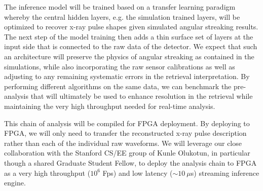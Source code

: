The inference model will be trained based on a transfer learning paradigm whereby the central hidden layers, e.g. the simulation trained layers, will be optimized to recover x-ray pulse shapes given simulated angular streaking results.
The next step of the model training then adds a thin surface set of layers at the input side that is connected to the raw data of the detector.
We expect that such an architecture will preserve the physics of angular streaking as contained in the simulations, while also incorporating the raw sensor calibrations as well as adjusting to any remaining systematic errors in the retrieval interpretation.
By performing different algorithms on the same data, we can benchmark the pre-analysis that will ultimately be used to enhance resolution in the retrieval while maintaining the very high throughput needed for real-time analysis.

This chain of analysis will be compiled for FPGA deployment.  
By deploying to FPGA, we will only need to transfer the reconstructed x-ray pulse description rather than each of the individual raw waveforms. 
We will leverage our close collaboration with the Stanford CS/EE group of Kunle Olukotun, in particular though a shared Graduate Student Fellow, to deploy the analysis chain to FPGA as a very high throughput ($10^6$ Fps) and low latency ($\sim10~\mu$s) streaming inference engine.

